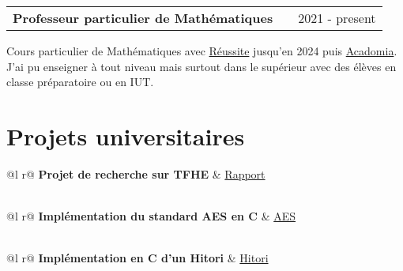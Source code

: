 \documentclass[a4paper,12pt]{article}
\makeatletter
\newenvironment{jobshort}[2]
    {
    \begin{tabularx}{\linewidth}{@{}l X r@{}}
    \textbf{#1} & \hfill &  #2 \\[3.75pt]
    \end{tabularx}
    }
    {
    }
\newenvironment{joblong}[2]
    {
    \begin{tabularx}{\linewidth}{@{}l X r@{}}
    \textbf{#1} & \hfill &  #2 \\[3.75pt]
    \end{tabularx}
    \begin{minipage}[t]{\linewidth}
    \begin{itemize}[nosep,after=\strut, leftmargin=1em, itemsep=3pt,label=--]
    }
    {
    \end{itemize}
    \end{minipage}    
    }
\makeatother
\begin{document}
\begin{jobshort}{Professeur particulier de Mathématiques}{2021 - present}
Cours particulier de Mathématiques avec \href{https://groupe-reussite.fr/}{Réussite} jusqu'en 2024 puis \href{https://www.acadomia.fr/}{Acadomia}. J'ai pu enseigner à tout niveau mais surtout dans le supérieur avec des élèves en classe préparatoire ou en IUT.
\end{jobshort}



\section{Projets universitaires}

\begin{tabularx}{\linewidth}{ @{}l r@{} }
\textbf{Projet de recherche sur TFHE} & \hfill \href{https://nicolasmendelboucharin.github.io/Moromat/fiches/Projet_TFHE.pdf}{Rapport} \\[3.75pt]
  \\
\end{tabularx}

\begin{tabularx}{\linewidth}{ @{}l r@{} }
\textbf{Implémentation du standard AES en C} & \hfill \href{https://github.com/NicolasMendelBoucharin/TPS/tree/main/AES}{AES} \\[3.75pt]
  \\
\end{tabularx}

\begin{tabularx}{\linewidth}{ @{}l r@{} }
\textbf{Implémentation en C d'un Hitori} & \hfill \href{https://github.com/NicolasMendelBoucharin/TPS/tree/main/hitori}{Hitori} \\[3.75pt]
  \\
\end{tabularx}
\end{document}

